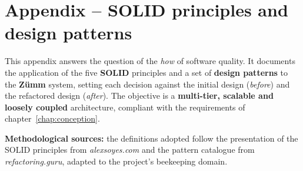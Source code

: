 
\chapter{Appendix -- SOLID principles and design patterns}
\label{chap:solid}
This appendix answers the question of the \emph{how} of software quality. It
documents the application of the five \textbf{SOLID} principles and a set of
\textbf{design patterns} to the \textbf{Zümm} system, setting each decision
against the initial design (\emph{before}) and the refactored design
(\emph{after}). The objective is a \textbf{multi-tier, scalable and loosely
coupled} architecture, compliant with the requirements of
chapter~\ref{chap:conception}.

\begin{encadre}
\textbf{Methodological sources:} the definitions adopted follow the presentation
of the SOLID principles from \emph{alexsoyes.com} and the pattern catalogue from
\emph{refactoring.guru}, adapted to the project's beekeeping domain.
\end{encadre}

